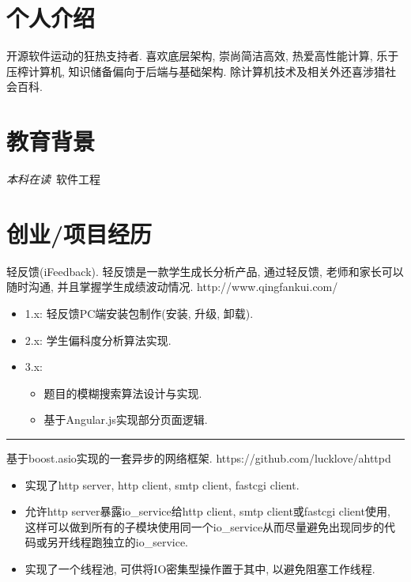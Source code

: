 \documentclass{resume}
\newcommand{\subsectionrule}{{\vspace{-8pt}\hspace{0.5cm}\rule[1pt]{\linewidth-1cm}{0.05pt}\vspace{-8pt}}}
\begin{document}


\section{\faUser 个人介绍}
开源软件运动的狂热支持者.
\newline
喜欢底层架构, 崇尚简洁高效, 热爱高性能计算, 乐于压榨计算机, 知识储备偏向于后端与基础架构.
\newline
除计算机技术及相关外还喜涉猎社会百科.

\section{\faGraduationCap 教育背景}
\textit{本科在读}\ 软件工程

\section{\faStar 创业/项目经历}
\begin{onehalfspacing}
轻反馈(iFeedback).
\newline
轻反馈是一款学生成长分析产品, 通过轻反馈, 老师和家长可以随时沟通, 并且掌握学生成绩波动情况.
\newline
http://www.qingfankui.com/
\begin{itemize}
  \item 1.x: 轻反馈PC端安装包制作(安装, 升级, 卸载).
  \item 2.x: 学生偏科度分析算法实现.
  \item 3.x:
  \begin{itemize} 
    \item 题目的模糊搜索算法设计与实现.
    \item 基于Angular.js实现部分页面逻辑.
  \end{itemize}
\end{itemize}
\end{onehalfspacing}

\subsectionrule

\begin{onehalfspacing}
基于boost.asio实现的一套异步的网络框架.
\newline
https://github.com/lucklove/ahttpd
\begin{itemize}
  \item 实现了http server, http client, smtp client, fastcgi client.
  \item 允许http server暴露io\_service给http client, smtp client或fastcgi client使用, 这样可以做到所有的子模块使用同一个io\_service从而尽量避免出现同步的代码或另开线程跑独立的io\_service.
  \item 实现了一个线程池, 可供将IO密集型操作置于其中, 以避免阻塞工作线程.
\end{itemize}
\end{onehalfspacing}
\end{document}
